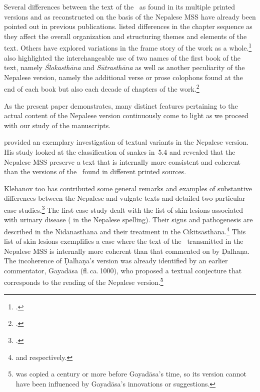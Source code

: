
Several differences between the text of the \SS\ as found in its multiple printed versions and 
as reconstructed on the basis of the Nepalese MSS have already been pointed out in previous 
publications.  \citet[27\,f]{kleb-2021b} listed differences in the chapter sequence as they 
affect
the overall organization and structuring themes and elements of the text.  Others have 
explored variations in the frame story of the work as a whole.\footcites
    {wuja-2013} 		
    [28-32]{kleb-2021b} 
    {birc-2021} 
    [2-4]{birc-2021a}
\citeauthor{kleb-2021b} also highlighted the interchangeable use of two names of the
first book of the text, namely \emph{Ślokasthāna} and \emph{Sūtrasthāna} as well
as another peculiarity of the Nepalese version, namely the additional verse or prose
colophons found at the end of each book but also each decade of chapters of the
work.\footcite[32--44]{kleb-2021b}

As the present paper demonstrates, many distinct features pertaining to the actual
content of the Nepalese version continuously come to light as we proceed with our
study of the manuscripts. 

\citet[101–104]{hari-2011} provided an exemplary investigation of textual variants in the 
Nepalese version.  His study looked at the classification of snakes in
\SS\,5.4 and revealed that the Nepalese MSS preserve a text that is internally
more consistent and coherent than the versions of the \SS\ found
in different printed sources.

Klebanov too has contributed some general remarks and examples of substantive differences 
between the Nepalese and vulgate texts 
and detailed two particular case studies.\footcite[44--55]{kleb-2021b} The first
case study dealt with the list of skin lesions associated with urinary disease
( in the Nepalese spelling).  Their signs and pathogenesis are
described in the Nidānasthāna and their treatment in the 
Cikitsāsthāna.\footnote{ and 
 respectively.} 
This list of skin lesions exemplifies a case where the text of the \SS\ transmitted
in the Nepalese MSS is internally more coherent than that commented on by Ḍalhaṇa.
The incoherence of Ḍalhaṇa's version was already identified by an earlier
commentator, Gayadāsa (fl.\,ca.\,1000), 
who
proposed a textual conjecture that corresponds to the reading of the Nepalese
version.\footnote{ was copied a century or more before
    Gayadāsa's time, so its version cannot have been influenced by Gayadāsa's
    innovations or suggestions.} 

